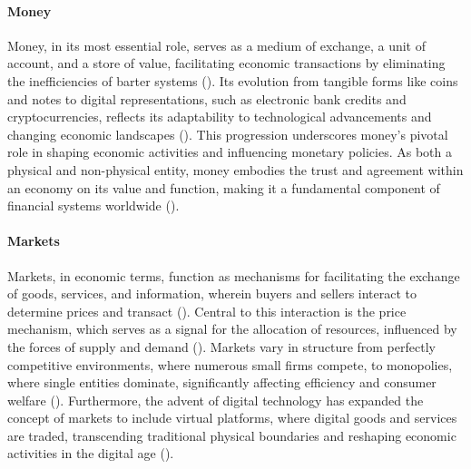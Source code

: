 \documentclass{article}
\begin{document}
\paragraph{Money} 
Money, in its most essential role, serves as a medium of exchange, a unit of account, and a store of value, facilitating economic transactions by eliminating the inefficiencies of barter systems (\cite{mishkin}). Its evolution from tangible forms like coins and notes to digital representations, such as electronic bank credits and cryptocurrencies, reflects its adaptability to technological advancements and changing economic landscapes (\cite{nakamoto}). This progression underscores money's pivotal role in shaping economic activities and influencing monetary policies. As both a physical and non-physical entity, money embodies the trust and agreement within an economy on its value and function, making it a fundamental component of financial systems worldwide (\cite{menger}).

\paragraph{Markets}
Markets, in economic terms, function as mechanisms for facilitating the exchange of goods, services, and information, wherein buyers and sellers interact to determine prices and transact (\cite{marshall}). Central to this interaction is the price mechanism, which serves as a signal for the allocation of resources, influenced by the forces of supply and demand (\cite{smith}). Markets vary in structure from perfectly competitive environments, where numerous small firms compete, to monopolies, where single entities dominate, significantly affecting efficiency and consumer welfare (\cite{schumpeter}). Furthermore, the advent of digital technology has expanded the concept of markets to include virtual platforms, where digital goods and services are traded, transcending traditional physical boundaries and reshaping economic activities in the digital age (\cite{digitalEconomy}).\par
\end{document}
